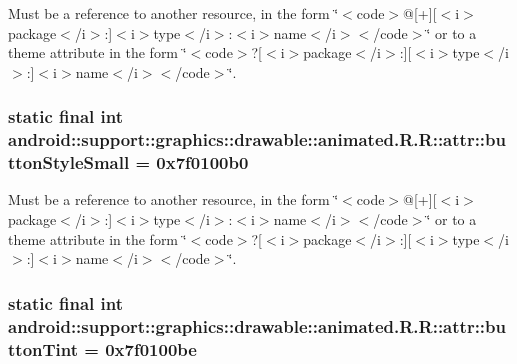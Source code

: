 Must be a reference to another resource, in the form \char`\"{}$<$code$>$@\mbox{[}+\mbox{]}\mbox{[}$<$i$>$package$<$/i$>$:\mbox{]}$<$i$>$type$<$/i$>$:$<$i$>$name$<$/i$>$$<$/code$>$\char`\"{} or to a theme attribute in the form \char`\"{}$<$code$>$?\mbox{[}$<$i$>$package$<$/i$>$:\mbox{]}\mbox{[}$<$i$>$type$<$/i$>$:\mbox{]}$<$i$>$name$<$/i$>$$<$/code$>$\char`\"{}. \hypertarget{classandroid_1_1support_1_1graphics_1_1drawable_1_1animated_1_1_r_1_1attr_cc4b73b4499fbe55d74123666a8729ac}{
\subsubsection[{buttonStyleSmall}]{\setlength{\rightskip}{0pt plus 5cm}static final int android::support::graphics::drawable::animated.R.R::attr::buttonStyleSmall = 0x7f0100b0}}
\label{classandroid_1_1support_1_1graphics_1_1drawable_1_1animated_1_1_r_1_1attr_cc4b73b4499fbe55d74123666a8729ac}


Must be a reference to another resource, in the form \char`\"{}$<$code$>$@\mbox{[}+\mbox{]}\mbox{[}$<$i$>$package$<$/i$>$:\mbox{]}$<$i$>$type$<$/i$>$:$<$i$>$name$<$/i$>$$<$/code$>$\char`\"{} or to a theme attribute in the form \char`\"{}$<$code$>$?\mbox{[}$<$i$>$package$<$/i$>$:\mbox{]}\mbox{[}$<$i$>$type$<$/i$>$:\mbox{]}$<$i$>$name$<$/i$>$$<$/code$>$\char`\"{}. \hypertarget{classandroid_1_1support_1_1graphics_1_1drawable_1_1animated_1_1_r_1_1attr_c8934315e99c543a6192b3a7e57aa42f}{
\subsubsection[{buttonTint}]{\setlength{\rightskip}{0pt plus 5cm}static final int android::support::graphics::drawable::animated.R.R::attr::buttonTint = 0x7f0100be}}
\label{classandroid_1_1support_1_1graphics_1_1drawable_1_1animated_1_1_r_1_1attr_c8934315e99c543a6192b3a7e57aa42f}


